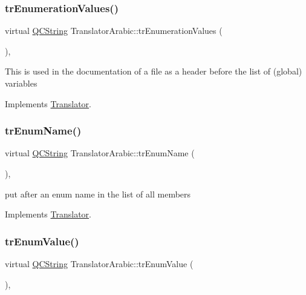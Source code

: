 \subsubsection{\texorpdfstring{trEnumerationValues()}{trEnumerationValues()}}
{\footnotesize\ttfamily virtual \mbox{\hyperlink{class_q_c_string}{Q\+C\+String}} Translator\+Arabic\+::tr\+Enumeration\+Values (\begin{DoxyParamCaption}{ }\end{DoxyParamCaption})\hspace{0.3cm}{\ttfamily [inline]}, {\ttfamily [virtual]}}

This is used in the documentation of a file as a header before the list of (global) variables 

Implements \mbox{\hyperlink{class_translator}{Translator}}.

\mbox{\label{class_translator_arabic_a52b5269a3a05a149a3320d3ade072ec9}} 
\subsubsection{\texorpdfstring{trEnumName()}{trEnumName()}}
{\footnotesize\ttfamily virtual \mbox{\hyperlink{class_q_c_string}{Q\+C\+String}} Translator\+Arabic\+::tr\+Enum\+Name (\begin{DoxyParamCaption}{ }\end{DoxyParamCaption})\hspace{0.3cm}{\ttfamily [inline]}, {\ttfamily [virtual]}}

put after an enum name in the list of all members 

Implements \mbox{\hyperlink{class_translator}{Translator}}.

\mbox{\label{class_translator_arabic_ae9b4ecec9913389fea6432dc2171afb5}} 
\subsubsection{\texorpdfstring{trEnumValue()}{trEnumValue()}}
{\footnotesize\ttfamily virtual \mbox{\hyperlink{class_q_c_string}{Q\+C\+String}} Translator\+Arabic\+::tr\+Enum\+Value (\begin{DoxyParamCaption}{ }\end{DoxyParamCaption})\hspace{0.3cm}{\ttfamily [inline]}, {\ttfamily [virtual]}}

